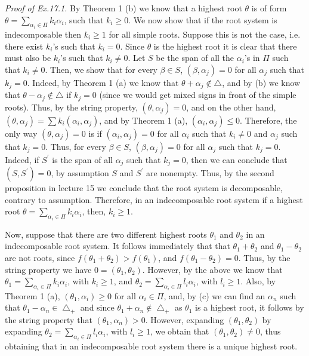 \documentclass[11pt]{article}
\begin{document}
\textit{Proof of Ex.17.1.} 
By Theorem 1 (b) we know that a highest root $\theta$ is of form $\theta=\sum_{\alpha_i \in \Pi} k_i \alpha_i$, such that $k_i \geq 0$. We now show that if the root system is indecomposable then $k_i\geq 1$ for all simple roots. Suppose this is not the case, i.e. there exist $k_i$'s such that $k_i=0$. Since $\theta$ is the highest root it is clear that there must also be $k_i$'s such that $k_i \neq 0$. Let $S$ be the span of all the $\alpha_i$'s in $\Pi$ such that $k_i\neq 0$. Then, we show that for every $\beta \in S$, $(\beta, \alpha_j)=0$ for all $\alpha_j$ such that $k_j=0$. Indeed, by Theorem 1 (a) we know that $\theta+\alpha_j\not \in \bigtriangleup$, and by (b) we know that  $\theta-\alpha_j\not \in \bigtriangleup$ if $k_j=0$ (since we would get mixed signs in front of the simple roots). Thus, by the string property, $(\theta, \alpha_j)=0$, and on the other hand, $(\theta, \alpha_j)=\sum k_i (\alpha_i, \alpha_j)$, and by Theorem 1 (a), $(\alpha_i, \alpha_j)\leq 0$. Therefore, the only way $(\theta, \alpha_j)=0$ is if $(\alpha_i, \alpha_j)=0$ for all $\alpha_i$ such that $k_i \neq 0$ and $\alpha_j$ such that $k_j=0$. Thus, for every $\beta \in S$, $(\beta, \alpha_j)=0$ for all $\alpha_j$ such that $k_j=0$. Indeed, if $S^{'}$ is the span of all $\alpha_j$ such that $k_j=0$, then we can conclude that $(S, S^{'})=0$, by assumption $S$ and $S^{'}$ are nonempty. Thus, by the second proposition in lecture 15 we conclude that the root system is decomposable, contrary to assumption. Therefore, in an indecomposable root system if a highest root $\theta=\sum_{\alpha_i \in \Pi}k_i \alpha_i$, then, $k_i \geq 1$.  

Now, suppose that there are two different highest roots $\theta_1$ and $\theta_2$ in an indecomposable root system. It follows immediately that 
 that $\theta_1+\theta_2$ and $\theta_1-\theta_2$ are not roots, since $f(\theta_1+\theta_2)>f(\theta_1)$, and $f(\theta_1-\theta_2)=0$. Thus, by the string property we have $0=(\theta_1, \theta_2)$. However, by the above we know that
$\theta_1=\sum_{\alpha_i \in \Pi}k_i \alpha_i$,  with $k_i \geq 1$, and   $\theta_2=\sum_{\alpha_i \in \Pi}l_i \alpha_i$, with $l_i \geq 1$. Also, by Theorem 1 (a), $(\theta_1, \alpha_i) \geq 0$ for all $\alpha_i \in \Pi$, and, by (c) we can find an $\alpha_n$ such that $\theta_1 - \alpha_n \in \bigtriangleup_{+}$ and since  $\theta_1 +\alpha_n \not \in \bigtriangleup_{+}$ as $\theta_1$ is a highest root, it follows by the string property that $(\theta_1, \alpha_n)>0$. However, expanding $(\theta_1, \theta_2)$ by expanding $\theta_2=\sum_{\alpha_i \in \Pi}l_i \alpha_i$, with $l_i \geq 1$, we obtain that $(\theta_1, \theta_2)\neq 0$, thus obtaining that in an indecomposable root system there is a unique highest root. 
\end{document}
